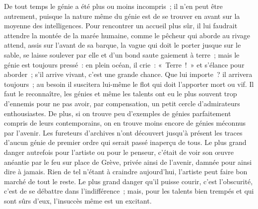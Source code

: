 \documentclass[french,twoside]{book} %
\begin{document}
De tout temps le génie a été plus ou moins incompris ; il n’en peut être autrement, puisque la nature même du génie est de se trouver en avant sur la moyenne des intelligences. Pour rencontrer un accueil plus sûr, il lui faudrait attendre la montée de la marée humaine, comme le pêcheur qui aborde au rivage attend, assis sur l’avant de sa barque, la vague qui doit le porter jusque sur le sable, se laisse soulever par elle et d’un bond saute gaiement à terre ; mais le génie est toujours pressé : en plein océan, il crie : « Terre ! » et s’élance pour aborder ; s’il arrive vivant, c’est une grande chance. Que lui importe ? il arrivera toujours ; au besoin il suscitera lui-même le flot qui doit l’apporter mort ou vif. Il faut le reconnaître, les génies et même les talents ont eu le plus souvent trop d’ennemis pour ne pas avoir, par compensation, un petit cercle d’admirateurs enthousiastes. De plus, si on trouve peu d’exemples de génies parfaitement compris de leurs contemporains, on en trouve moins encore de génies méconnus par l’avenir. Les fureteurs d’archives n’ont découvert jusqu’à présent les traces d’aucun génie de premier ordre qui serait passé inaperçu de tous. Le plus grand danger autrefois pour l’artiste ou pour le penseur, c’était de voir son œuvre anéantie par le feu sur place de Grève, privée ainsi de l’avenir, damnée pour ainsi dire à jamais. Rien de tel n’étant à craindre aujourd’hui, l’artiste peut faire bon marché de tout le reste. Le plus grand danger qu’il puisse courir, c’est l’obscurité, c’est de se débattre dans  l’indifférence ; mais, pour les talents bien trempés et qui sont sûrs d’eux, l’insuccès même est un excitant.\par
\end{document}
